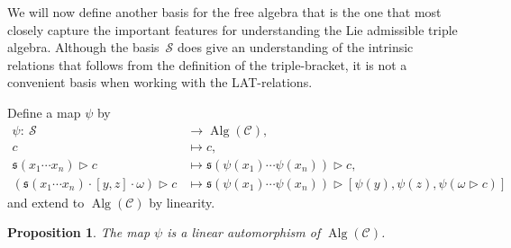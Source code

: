 \documentclass[10pt,a4paper]{amsart}
\newcommand*{\Alg}{\operatorname{Alg}}
\numberwithin{equation}{section}
\newtheorem{Proposition}[Theorem]{Proposition}
 { \theoremstyle{definition}
\newtheorem{Definition}[Theorem]{Definition}
\newtheorem{Note}[Theorem]{Note}
\newtheorem{Example}[Theorem]{Example}
\newtheorem{Remark}[Theorem]{Remark} }
\begin{document}
We will now define another basis for the free algebra that is the one that most closely capture the important features for understanding the Lie admissible triple algebra. Although the basis~$\mathcal{S}$ does give an understanding of the intrinsic relations that follows from the definition of the triple-bracket, it is not a convenient basis when working with the LAT-relations.

\begin{Definition}
 Define a map $\psi$ by
 \begin{align*}
 \psi\colon \ \mathcal{S} &\longrightarrow \Alg(\mathcal{C}), \\
 c &\longmapsto c ,\\
 \mathfrak{s}(x_1 \cdots x_n) \rhd c &\longmapsto \mathfrak{s}(\psi(x_1) \cdots \psi(x_n)) \rhd c, \\
 (\mathfrak{s}(x_1 \cdots x_n) \cdot [y, z] \cdot \omega) \rhd c & \longmapsto \mathfrak{s}(\psi(x_1) \cdots \psi(x_n)) \rhd [\psi(y), \psi(z), \psi(\omega \rhd c)]
 \end{align*}
 and extend to $\Alg(\mathcal{C})$ by linearity.
\end{Definition}

\begin{Proposition}
 The map $\psi$ is a linear automorphism of $\Alg(\mathcal{C})$.%
\end{Proposition}
\end{document}
